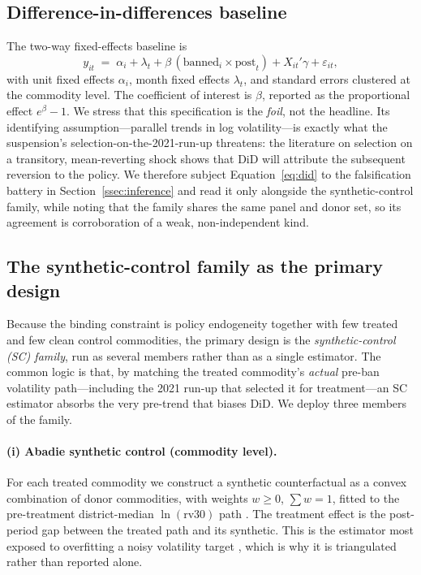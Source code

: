 \subsection{Difference-in-differences baseline}

The two-way fixed-effects baseline is
\begin{equation}
y_{it} \;=\; \alpha_i + \lambda_t + \beta\,(\text{banned}_i \times \text{post}_t) + X_{it}'\gamma + \varepsilon_{it},
\label{eq:did}
\end{equation}
with unit fixed effects $\alpha_i$, month fixed effects $\lambda_t$, and standard errors
clustered at the commodity level. The coefficient of interest is $\beta$, reported as the
proportional effect $e^{\beta}-1$. We stress that this specification is the \emph{foil},
not the headline. Its identifying assumption---parallel trends in log volatility---is
exactly what the suspension's selection-on-the-2021-run-up threatens: the literature on
selection on a transitory, mean-reverting shock \citep{Ashenfelter1978, ChabeFerret} shows
that DiD will attribute the subsequent reversion to the policy. We therefore subject
Equation~\eqref{eq:did} to the falsification battery in Section~\ref{ssec:inference} and
read it only alongside the synthetic-control family, while noting that the family shares
the same panel and donor set, so its agreement is corroboration of a weak, non-independent
kind.

\subsection{The synthetic-control family as the primary design}

Because the binding constraint is policy endogeneity together with few treated and few
clean control commodities, the primary design is the \emph{synthetic-control (SC) family},
run as several members rather than as a single estimator. The common logic is that, by
matching the treated commodity's \emph{actual} pre-ban volatility path---including the 2021
run-up that selected it for treatment---an SC estimator absorbs the very pre-trend that
biases DiD. We deploy three members of the family.

\paragraph{(i) Abadie synthetic control (commodity level).}
For each treated commodity we construct a synthetic counterfactual as a convex combination
of donor commodities, with weights $w \ge 0$, $\sum w = 1$, fitted to the pre-treatment
district-median $\ln(\mathrm{rv30})$ path \citep{Abadie2010, AbadieReview}. The treatment
effect is the post-period gap between the treated path and its synthetic. This is the
estimator most exposed to overfitting a noisy volatility target \citep{AbadieVives}, which
is why it is triangulated rather than reported alone.

